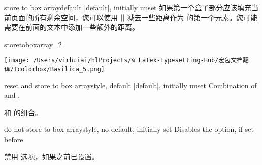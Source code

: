 \begin{docTcbKey}[][doc new=2015-07-13]{store to box array}{}{default |default|, initially unset}
如果第一个盒子部分应该填充当前页面的所有剩余空间，您可以使用 $|\pagegoal-\pagetotal|$ 减去一些距离作为  的第一个元素。您可能需要在前面的文本中添加一些额外的距离。
\begin{dispListing}
\begin{tcolorbox}[enhanced,breakable,
reset box array,
store to box array,
break at=\pagegoal-\pagetotal-5mm/0pt,
height fixed for=first and middle]
\lipsum[1-15]
\end{tcolorbox}%
%
\end{dispListing}


\begin{exdispExample}{storetoboxarray_2}
\begin{tcolorbox}[blanker,width=4cm,
fontupper=\footnotesize,
enforce breakable,%
break at=4cm,
height fixed for=all,
watermark text=\arabic{tcbbreakpart},
reset box array,
store to box array
]
\texttt{[image: /Users/virhuiai/hlProjects/\%
Latex-Typesetting-Hub/宏包文档翻译/tcolorbox/Basilica\_5.png]}\par
\lipsum[1-2]
\end{tcolorbox}

\begin{tcbitemize}[raster columns=3,raster equal height,
size=small,halign=center,sharp corners,colback=blue!5]
\tcbitem{}
\tcbitem{}
\tcbitem{}
\tcbitem{}
\tcbitem{}
\tcbitem{}
\end{tcbitemize}
\end{exdispExample}
\end{docTcbKey}


\begin{docTcbKey}[][doc new=2015-07-13]{reset and store to box array}{}{style, default |default|, initially unset}
Combination of  and .

 和  的组合。
\end{docTcbKey}



\begin{docTcbKey}[][doc new=2015-07-13]{do not store to box array}{}{style, no default, initially set}
Disables the  option, if set before.

禁用  选项，如果之前已设置。
\end{docTcbKey}


